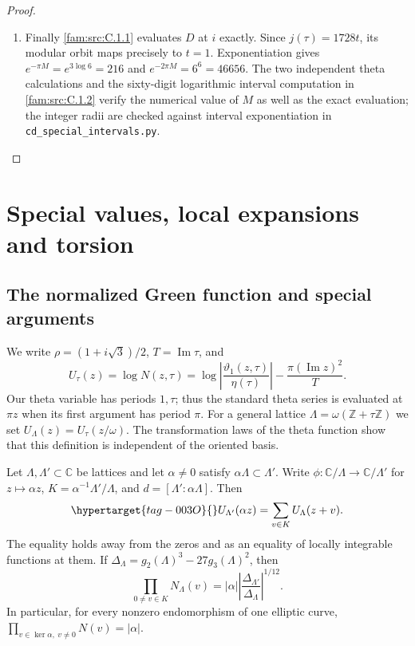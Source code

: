 \begin{proof}
\begin{enumerate}[label=\arabic*.,leftmargin=*]
\item Finally \ref{fam:src:C.1.1} evaluates $D$ at $i$ exactly. Since $j(\tau)=1728t$, its
modular orbit maps precisely to $t=1$. Exponentiation gives
$e^{-\pi M}=e^{3\log6}=216$ and $e^{-2\pi M}=6^6=46656$.
The two independent theta calculations and the sixty-digit logarithmic
interval computation in \ref{fam:src:C.1.2} verify the numerical value of $M$ as well
as the exact evaluation; the integer radii are checked against interval
exponentiation in \texttt{cd\_special\_intervals.py}.
\end{enumerate}
\end{proof}


\section{Special values, local expansions and torsion}
\subsection{The normalized Green function and special arguments}
We write $\rho=(1+i\sqrt3)/2$, $T=\operatorname{Im}\tau$, and
\[
 U_\tau(z)=\log N(z,\tau)
 =\log\left|\frac{\vartheta _1(z,\tau)}{\eta(\tau)}\right|
       -\frac{\pi(\operatorname{Im}z)^2}{T}.
\]
Our theta variable has periods $1,\tau$; thus the standard theta series
is evaluated at $\pi z$ when its first argument has period $\pi$.
For a general lattice $\Lambda=\omega(\mathbb Z+\tau\mathbb Z)$ we set
$U_\Lambda(z)=U_\tau(z/\omega)$. The transformation laws of the theta
function show that this definition is independent of the oriented basis.

\begin{proposition}\hypertarget{tag-000I}{}\label{ari:C.1.1}

Let $\Lambda,\Lambda'\subset\mathbb C$ be lattices and let
$\alpha\ne0$ satisfy $\alpha\Lambda\subset\Lambda'$. Write
$\phi:\mathbb C/\Lambda\to\mathbb C/\Lambda'$ for $z\mapsto\alpha z$,
$K=\alpha^{-1}\Lambda'/\Lambda$, and
$d=[\Lambda':\alpha\Lambda]$. Then
\begin{equation}\hypertarget{tag-003O}{}\label{ari:eq:cs-isogeny}
 U_{\Lambda'}(\alpha z)=\sum_{v\in K}U_\Lambda(z+v).
\end{equation}
The equality holds away from the zeros and as an equality of locally
integrable functions at them. If $\Delta_\Lambda=g_2(\Lambda)^3-
27g_3(\Lambda)^2$, then
\[
 \prod_{0\ne v\in K}N_\Lambda(v)
 =|\alpha|\left|\frac{\Delta_{\Lambda'}}{\Delta_\Lambda}\right|^{1/12}.
\]
In particular, for every nonzero endomorphism of one elliptic curve,
$\prod_{v\in\ker\alpha,\ v\ne0}N(v)=|\alpha|$.
\end{proposition}


